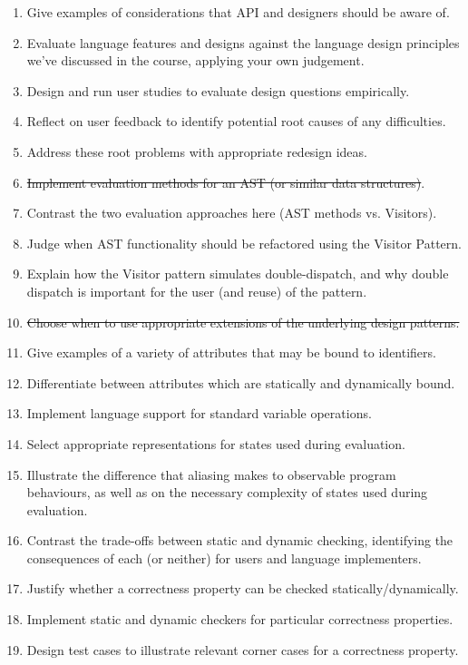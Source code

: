 \documentclass{article}
\begin{document}
\begin{itemize}
\begin{enumerate}
        \item Give examples of considerations that API and designers should be aware of.
        \item Evaluate language features and designs against the language design principles we've discussed in the course, applying your own judgement.
        \item Design and run user studies to evaluate design questions empirically.
        \item Reflect on user feedback to identify potential root causes of any difficulties.
        \item Address these root problems with appropriate redesign ideas.
        \item \sout{Implement evaluation methods for an AST (or similar data structures)}.
        \item Contrast the two evaluation approaches here (AST methods vs. Visitors).
        \item Judge when AST functionality should be refactored using the Visitor Pattern.
        \item Explain how the Visitor pattern simulates double-dispatch, and why double dispatch is important for the user (and reuse) of the pattern.
        \item \sout{Choose when to use appropriate extensions of the underlying design patterns.}
        \item Give examples of a variety of attributes that may be bound to identifiers.
        \item Differentiate between attributes which are statically and dynamically bound.
        \item Implement language support for standard variable operations.
        \item Select appropriate representations for states used during evaluation.
        \item Illustrate the difference that aliasing makes to observable program behaviours, as well as on the necessary complexity of states used during evaluation.
        \item Contrast the trade-offs between static and dynamic checking, identifying the consequences of each (or neither) for users and language implementers.
        \item Justify whether a correctness property can be checked statically/dynamically.
        \item Implement static and dynamic checkers for particular correctness properties.
        \item Design test cases to illustrate relevant corner cases for a correctness property.

\end{enumerate}
\end{itemize}
\end{document}
